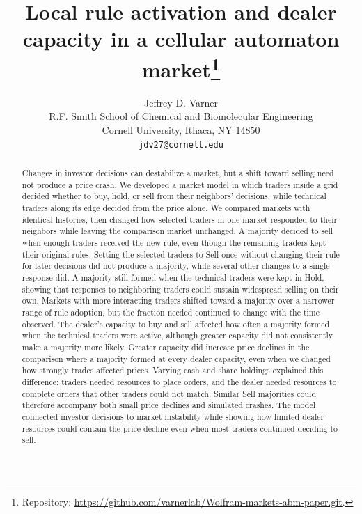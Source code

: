 \documentclass{article}
\title{Local rule activation and dealer capacity in a cellular automaton market\thanks{Repository: \url{https://github.com/varnerlab/Wolfram-markets-abm-paper.git}.}}
\author{%
  Jeffrey D. Varner \\
  R.F. Smith School of Chemical and Biomolecular Engineering\\
  Cornell University, Ithaca, NY 14850 \\
  \texttt{jdv27@cornell.edu} \\
}
\theoremstyle{definition}
\theoremstyle{remark}
\begin{document}
\raggedbottom

\maketitle

\begin{abstract}
Changes in investor decisions can destabilize a market, but a shift toward
selling need not produce a price crash. We developed a market model in which
traders inside a grid decided whether to buy, hold, or sell from their
neighbors' decisions, while technical traders along its edge decided from
the price alone. We compared markets with identical
histories, then changed how selected traders in one market responded to
their neighbors while leaving the comparison market unchanged. A majority
decided to sell when enough traders received the new rule, even though the
remaining traders kept their original rules. Setting the selected traders
to Sell once without changing their rule for later decisions did not produce a
majority, while several other changes to a single response did. A majority
still formed when the technical traders were kept in Hold, showing that
responses to neighboring traders could sustain widespread selling on their
own. Markets with more interacting traders shifted toward a
majority over a narrower range of rule adoption, but the fraction needed
continued to change with the time observed. The dealer's capacity to buy and
sell affected how often a majority formed when the technical traders were
active, although greater capacity did not consistently make a majority more likely.
Greater capacity did increase price declines in the comparison where a majority formed at every dealer capacity, even when we changed how strongly trades affected prices. Varying
cash and share holdings explained this difference: traders needed resources
to place orders, and the dealer needed resources to complete orders that
other traders could not match. Similar Sell majorities could therefore
accompany both small price declines and simulated crashes. The model
connected investor decisions to market instability while showing how limited
dealer resources could contain the price decline even when most traders
continued deciding to sell.
\end{abstract}




\end{document}
